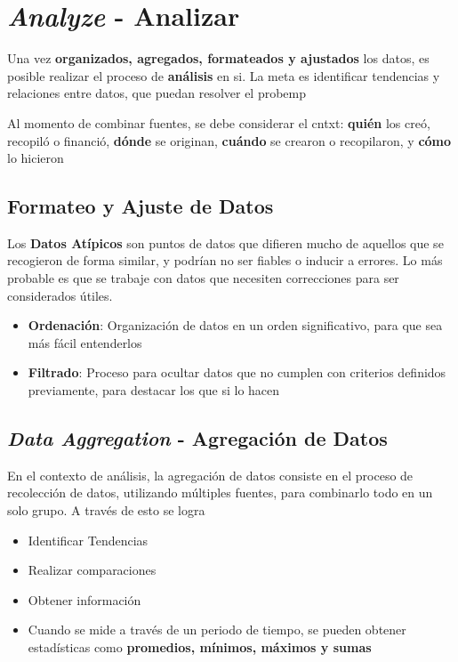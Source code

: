 \section{\textit{Analyze} - Analizar}
Una vez \textbf{organizados, agregados, formateados y ajustados} los datos, es posible realizar el proceso de \textbf{análisis} en si. La meta es identificar tendencias y relaciones entre datos, que puedan resolver el \gls{probemp}

Al momento de combinar fuentes, se debe considerar el \gls{cntxt}: \textbf{quién} los creó, recopiló o financió, \textbf{dónde} se originan, \textbf{cuándo} se crearon o recopilaron, y \textbf{cómo} lo hicieron

\subsection{Formateo y Ajuste de Datos}
Los \textbf{Datos Atípicos} son puntos de datos que difieren mucho de aquellos que se recogieron de forma similar, y podrían no ser fiables o inducir a errores. Lo más probable es que se trabaje con datos que necesiten correcciones para ser considerados útiles. 
\begin{itemize}
    \item {\textbf{Ordenación}: Organización de datos en un orden significativo, para que sea más fácil entenderlos} 
    \item {\textbf{Filtrado}: Proceso para ocultar datos que no cumplen con criterios definidos previamente, para destacar los que si lo hacen}
\end{itemize}

\subsection{\textit{Data Aggregation} - Agregación de Datos}
En el contexto de análisis, la agregación de datos consiste en el proceso de recolección de datos, utilizando múltiples fuentes, para combinarlo todo en un solo grupo. A través de esto se logra 
\begin{itemize}
    \item {Identificar Tendencias}
    \item {Realizar comparaciones}
    \item {Obtener información}
    \item {Cuando se mide a través de un periodo de tiempo, se pueden obtener estadísticas como \textbf{promedios, mínimos, máximos y sumas}}
\end{itemize}

